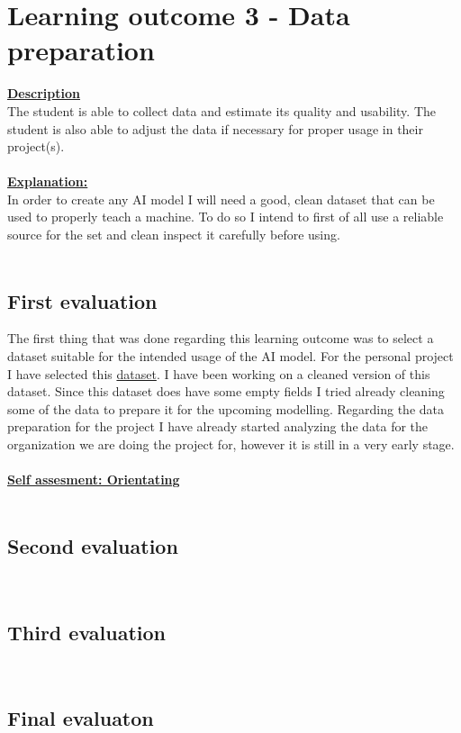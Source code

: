 \documentclass{article}
\begin{document}
\section{Learning outcome 3 - Data preparation}
\underline{\textbf{Description}}\\
The student is able to collect data and estimate its quality and usability. 
The student is also able to adjust the data if necessary for proper usage in their project(s).\\\\
\underline{\textbf{Explanation:}}\\
In order to create any AI model I will need a good, clean dataset that can be used to properly teach a machine.
To do so I intend to first of all use a reliable source for the set and clean inspect it carefully before using.\\\\
\subsection{First evaluation}
The first thing that was done regarding this learning outcome was to select a dataset suitable for the intended usage of the 
AI model. For the personal project I have selected this \href{https://www.kaggle.com/datasets/asaniczka/ufc-fighters-statistics}{dataset}. I have been working on a cleaned version of this dataset. 
Since this dataset does have some empty fields I tried already cleaning some of the data to prepare it for the upcoming modelling. Regarding the data preparation 
for the project I have already started analyzing the data for the organization we are doing the project for, however it is still in a very early stage.\\\\
\underline{\textbf{Self assesment: Orientating}}\\\\
\subsection{Second evaluation}\\
\subsection{Third evaluation}\\
\subsection{Final evaluaton}\\
\end{document}
